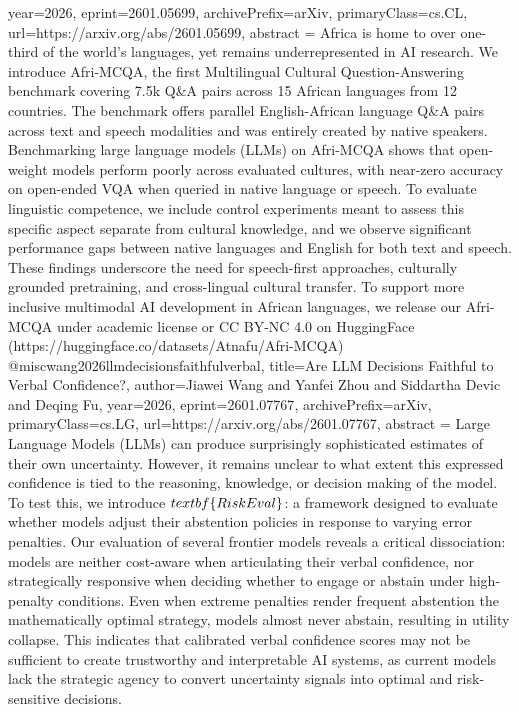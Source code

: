 {      year={2026},
      eprint={2601.05699},
      archivePrefix={arXiv},
      primaryClass={cs.CL},
      url={https://arxiv.org/abs/2601.05699},
      abstract = {Africa is home to over one-third of the world's languages, yet remains underrepresented in AI research. We introduce Afri-MCQA, the first Multilingual Cultural Question-Answering benchmark covering 7.5k Q&A pairs across 15 African languages from 12 countries. The benchmark offers parallel English-African language Q&A pairs across text and speech modalities and was entirely created by native speakers. Benchmarking large language models (LLMs) on Afri-MCQA shows that open-weight models perform poorly across evaluated cultures, with near-zero accuracy on open-ended VQA when queried in native language or speech. To evaluate linguistic competence, we include control experiments meant to assess this specific aspect separate from cultural knowledge, and we observe significant performance gaps between native languages and English for both text and speech. These findings underscore the need for speech-first approaches, culturally grounded pretraining, and cross-lingual cultural transfer. To support more inclusive multimodal AI development in African languages, we release our Afri-MCQA under academic license or CC BY-NC 4.0 on HuggingFace (https://huggingface.co/datasets/Atnafu/Afri-MCQA)}
}@misc{wang2026llmdecisionsfaithfulverbal,
      title={Are LLM Decisions Faithful to Verbal Confidence?}, 
      author={Jiawei Wang and Yanfei Zhou and Siddartha Devic and Deqing Fu},
      year={2026},
      eprint={2601.07767},
      archivePrefix={arXiv},
      primaryClass={cs.LG},
      url={https://arxiv.org/abs/2601.07767},
      abstract = {Large Language Models (LLMs) can produce surprisingly sophisticated estimates of their own uncertainty. However, it remains unclear to what extent this expressed confidence is tied to the reasoning, knowledge, or decision making of the model. To test this, we introduce $\\textbf\{RiskEval\}$: a framework designed to evaluate whether models adjust their abstention policies in response to varying error penalties. Our evaluation of several frontier models reveals a critical dissociation: models are neither cost-aware when articulating their verbal confidence, nor strategically responsive when deciding whether to engage or abstain under high-penalty conditions. Even when extreme penalties render frequent abstention the mathematically optimal strategy, models almost never abstain, resulting in utility collapse. This indicates that calibrated verbal confidence scores may not be sufficient to create trustworthy and interpretable AI systems, as current models lack the strategic agency to convert uncertainty signals into optimal and risk-sensitive decisions.}
}
